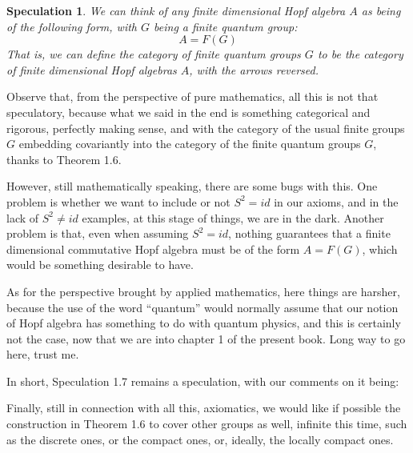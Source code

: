 \documentclass[12pt]{amsbook}
\newtheorem{comment}[theorem]{Comment}
\newtheorem{speculation}[theorem]{Speculation}
\begin{document}
\begin{speculation}
We can think of any finite dimensional Hopf algebra $A$ as being of the following form, with $G$ being a finite quantum group: 
$$A=F(G)$$
That is, we can define the category of finite quantum groups $G$ to be the category of finite dimensional Hopf algebras $A$, with the arrows reversed.
\end{speculation} 

Observe that, from the perspective of pure mathematics, all this is not that speculatory, because what we said in the end is something categorical and rigorous, perfectly making sense, and with the category of the usual finite groups $G$ embedding covariantly into the category of the finite quantum groups $G$, thanks to Theorem 1.6.

\bigskip

However, still mathematically speaking, there are some bugs with this. One problem is whether we want to include or not $S^2=id$ in our axioms, and in the lack of $S^2\neq id$ examples, at this stage of things, we are in the dark. Another problem is that, even when assuming $S^2=id$, nothing guarantees that a finite dimensional commutative Hopf algebra must be of the form $A=F(G)$, which would be something desirable to have.

\bigskip

As for the perspective brought by applied mathematics, here things are harsher, because the use of the word ``quantum'' would normally assume that our notion of Hopf algebra has something to do with quantum physics, and this is certainly not the case, now that we are into chapter 1 of the present book. Long way to go here, trust me.

\bigskip

In short, Speculation 1.7 remains a speculation, with our comments on it being:

Finally, still in connection with all this, axiomatics, we would like if possible the construction in Theorem 1.6 to cover other groups as well, infinite this time, such as the discrete ones, or the compact ones, or, ideally, the locally compact ones. 
\end{document}

